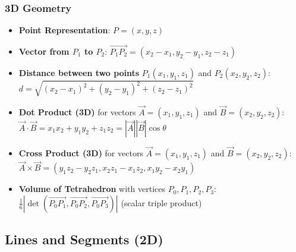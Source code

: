 \subsubsection*{3D Geometry}
\begin{itemize}
    \item \textbf{Point Representation}: $P=(x, y, z)$
    \item \textbf{Vector from $P_1$ to $P_2$}: $\vec{P_1P_2} = (x_2-x_1, y_2-y_1, z_2-z_1)$
    \item \textbf{Distance between two points} $P_1(x_1, y_1, z_1)$ and $P_2(x_2, y_2, z_2)$:
    $d = \sqrt{(x_2 - x_1)^2 + (y_2 - y_1)^2 + (z_2 - z_1)^2}$
    \item \textbf{Dot Product (3D)} for vectors $\vec{A}=(x_1, y_1, z_1)$ and $\vec{B}=(x_2, y_2, z_2)$:
    $\vec{A} \cdot \vec{B} = x_1 x_2 + y_1 y_2 + z_1 z_2 = |\vec{A}||\vec{B}|\cos\theta$
    \item \textbf{Cross Product (3D)} for vectors $\vec{A}=(x_1, y_1, z_1)$ and $\vec{B}=(x_2, y_2, z_2)$:
    $\vec{A} \times \vec{B} = (y_1 z_2 - y_2 z_1, x_2 z_1 - x_1 z_2, x_1 y_2 - x_2 y_1)$
    \item \textbf{Volume of Tetrahedron} with vertices $P_0, P_1, P_2, P_3$:
    $\frac{1}{6} |\det(\vec{P_0P_1}, \vec{P_0P_2}, \vec{P_0P_3})|$ (scalar triple product)
\end{itemize}

\subsection*{Lines and Segments (2D)}

